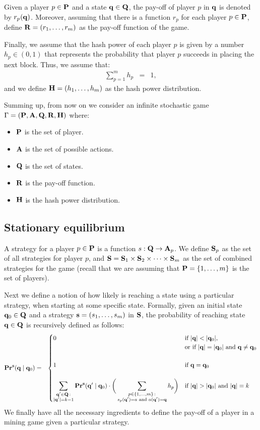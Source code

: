 \documentclass{article}
\begin{document}
Given a player $p \in \mathbf{P}$ and a state $\mathbf{q} \in \mathbf{Q}$, the pay-off of player $p$ in $\mathbf{q}$ is denoted by $r_p(\mathbf{q})$. Moreover, assuming that there is a  function $r_p$ for each player $p \in \mathbf{P}$, define $\mathbf{R} = (r_1, \ldots, r_m)$ as the pay-off function of the game.

Finally, we assume that the hash power of each player $p$ is given by a number $h_p \in (0,1)$ that represents the probability that player $p$ succeeds in placing the next block. Thus, we assume that:
\begin{eqnarray*}
\sum_{p=1}^m h_p & = &  1, 
\end{eqnarray*}and we define $\mathbf{H} = (h_1, \ldots, h_m)$ as the hash power distribution.


Summing up, from now on we consider an infinite stochastic game $\Gamma = (\mathbf{P},\mathbf{A},\mathbf{Q},\mathbf{R},\mathbf{H})$ where:
\begin{itemize}
	\item $\mathbf{P}$ is the set of player.
	\item $\mathbf{A}$ is the set of possible actions.
	\item $\mathbf{Q}$ is the set of states.
	\item $\mathbf{R}$ is the pay-off function.
	\item $\mathbf{H}$ is the hash power distribution.
\end{itemize} 


\subsection{Stationary equilibrium}
A strategy for a player $p \in \mathbf{P}$ is a function $s : \mathbf{Q} \rightarrow \mathbf{A}_p$. 
We define $\mathbf{S}_p$ as the set of all strategies for player $p$, and $\mathbf{S} = \mathbf{S}_{1} \times \mathbf{S}_{2} \times \cdots \times \mathbf{S}_{m}$ as the set of combined strategies for the game (recall that we are assuming that $\mathbf{P} = \{1, \ldots, m\}$ is the set of players). 

Next we define a notion of how likely is reaching a state using a particular strategy, when starting at some specific state. Formally, given an initial state $\mathbf{q}_0 \in \mathbf{Q}$ and a strategy $\mathbf{s} = (s_1, \ldots, s_m)$ in $\mathbf{S}$, 
the probability of reaching state $\mathbf{q} \in \mathbf{Q}$ is recursively defined as follows:
\begin{eqnarray*}
\mathbf{Pr}^{\mathbf{s}}(\mathbf{q} \mid \mathbf{q}_0) & = &
\begin{cases}
0 & \text{if } |\mathbf{q}| < |\mathbf{q}_0|,\\
& \text{or if }  |\mathbf{q}| = |\mathbf{q}_0| \text{ and } \mathbf{q} \neq \mathbf{q}_0\\
&\\
1 & \text{if } \mathbf{q} =  \mathbf{q}_0\\
& \\
{\displaystyle \sum_{\substack{\mathbf{q}' \in \mathbf{Q} \,:\\ |\mathbf{q}'| = k-1}} \mathbf{Pr}^{\mathbf{s}}(\mathbf{q}' \mid \mathbf{q}_0) \cdot \bigg(\sum_{\substack{p \in \{1, \ldots, m\} \,: \\ s_p(\mathbf{q}') = a \text{ and } a(\mathbf{q}') = \mathbf{q}}} h_p\bigg)}
 & \text{if } |\mathbf{q}| > |\mathbf{q}_0| \text{ and } |\mathbf{q}| = k
\end{cases}
\end{eqnarray*}
We finally have all the necessary ingredients to define the pay-off of a player in a mining game given a particular strategy.
\end{document}
